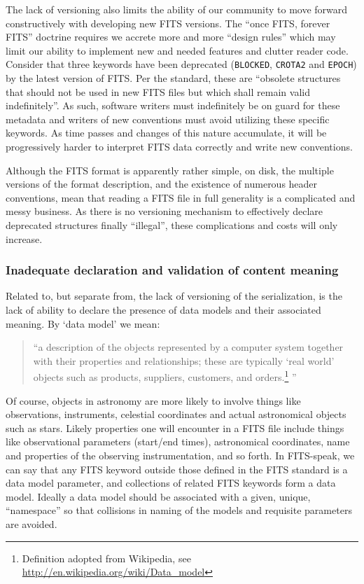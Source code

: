 \documentclass[final,authoryear,5p,times,twocolumn]{elsarticle}
\begin{document}
{{The lack of versioning also limits the ability of our community to
move forward constructively with developing new FITS versions.
The ``once FITS, forever FITS'' doctrine requires we accrete
more and more ``design rules'' which may limit our ability to implement
new and needed features and clutter reader code. Consider that three keywords
have been deprecated
(\texttt{BLOCKED}, \texttt{CROTA2} and \texttt{EPOCH}) by the latest version
of FITS. Per the standard, these are ``obsolete structures that should not be
used in new FITS files but which shall remain valid indefinitely''.
As such, software writers must indefinitely be on guard for these metadata
and writers of new conventions must avoid utilizing these specific keywords.
As time passes and changes of this nature accumulate, it will be progressively
harder to interpret FITS data correctly and write new conventions.


Although the FITS format is apparently rather simple, on disk, the
multiple versions of the format description, and the existence of
numerous header conventions, mean that reading a FITS file in full
generality is a complicated and messy business.  As there is no
versioning mechanism to effectively declare deprecated structures
finally ``illegal'', these complications and costs will only
increase.


\subsubsection{Inadequate declaration and validation of content meaning}


Related to, but separate from, the lack of versioning of the
serialization, is the lack of ability to declare the presence of data
models and their associated meaning.  By `data model' we
mean:


\begin{quote}
``a description of the objects represented by a computer system
together with their properties and relationships; these are typically
`real world' objects such as products, suppliers, customers, and
orders.\footnote{Definition adopted from Wikipedia, see
\url{http://en.wikipedia.org/wiki/Data\_model}}
''
\end{quote}


Of course, objects in astronomy are more likely to involve things like
observations, instruments, celestial coordinates and actual astronomical
objects such as stars. Likely properties one will encounter in a FITS
file include things like observational parameters (start/end times),
astronomical coordinates, name and properties of the observing
instrumentation, and so forth. In FITS-speak, we can say that any FITS
keyword outside those defined in the FITS standard is a data model
parameter, and collections of related FITS keywords form a data model.
Ideally a data model should be associated with a given, unique,
``name\-space'' so that collisions in naming of the models and requisite
parameters are avoided.


}}
\end{document}
